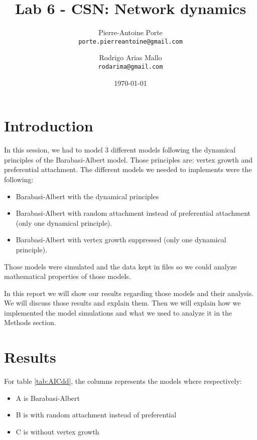 \documentclass{article}
\title{Lab 6 - CSN: Network dynamics}
\author{Pierre-Antoine Porte \\ \texttt{porte.pierreantoine@gmail.com}
\and Rodrigo Arias Mallo \\ \texttt{rodarima@gmail.com}}
\date{\today}
\begin{document}
\maketitle

\section{Introduction}

In this session, we had to model 3 different models following the dynamical 
principles of the Barabasi-Albert model. Those principles are: vertex growth and 
preferential attachment. The different models we needed to implements were the 
following:

\begin{itemize}
	\item Barabasi-Albert with the dynamical principles
	\item Barabasi-Albert with random attachment instead of preferential 
	attachment (only one dynamical principle).
	\item Barabasi-Albert with vertex growth suppressed (only one dynamical 
	principle).
\end{itemize}

Those models were simulated and the data kept in files so we could analyze 
mathematical properties of those models.

In this report we will show our results regarding those models and their 
analysis. We will discuss those results and explain them. Then we will explain 
how we implemented the model simulations and what we used to analyze it in the 
Methods section.

\section{Results}

For table \ref{tab:AICdd}, the columns represents the models where respectively:

\begin{itemize}
		\item A is Barabasi-Albert
		\item B is with random attachment instead of preferential
		\item C is without vertex growth
\end{itemize}

\end{document}
